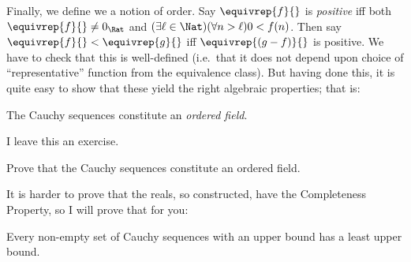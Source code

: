 \documentclass[../../../include/open-logic-section]{subfiles}
\begin{document}
Finally, we define we a notion of order. Say $\equivrep{f}{}$ is \emph{positive} iff both $\equivrep{f}{}\neq 0_\Rat$ and $(\exists \ell \in \Nat)(\forall n > \ell)0 < f(n)$. Then say $\equivrep{f}{} < \equivrep{g}{}$ iff $\equivrep{(g - f)}{}$ is positive. We have to check that this is well-defined (i.e.\ that it does not depend upon choice of ``representative'' function from the equivalence class). 
But having done this, it is quite easy to show that these yield the right algebraic properties; that is:
\begin{thm}
	The Cauchy sequences constitute an \emph{ordered field}.
\end{thm}\noindent
I leave this an exercise. 
\begin{prob}
	Prove that the Cauchy sequences constitute an ordered field.
\end{prob}
It is harder to prove that the reals, so constructed, have the Completeness Property, so I will prove that for you:
\begin{thm}
	Every non-empty set of Cauchy sequences with an upper bound has a least upper bound.
\end{thm}
\end{document}
